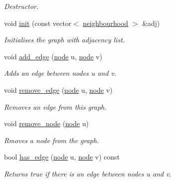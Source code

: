 \begin{DoxyCompactItemize}
\begin{DoxyCompactList}\small\item\em Destructor. \end{DoxyCompactList}\item 
void \hyperlink{classlgraph_1_1utils_1_1udgraph_a1006a1b36bd215c7a059dadce714434d}{init} (const vector$<$ \hyperlink{namespacelgraph_1_1utils_a0f2ef47028a466d26841709e705390ac}{neighbourhood} $>$ \&adj)
\begin{DoxyCompactList}\small\item\em Initialises the graph with adjacency list. \end{DoxyCompactList}\item 
void \hyperlink{classlgraph_1_1utils_1_1udgraph_accf8897335f6cfce5e001c2907462226}{add\-\_\-edge} (\hyperlink{namespacelgraph_1_1utils_a7bd66ede3805ef121bc2835bd48de0cf}{node} u, \hyperlink{namespacelgraph_1_1utils_a7bd66ede3805ef121bc2835bd48de0cf}{node} v)
\begin{DoxyCompactList}\small\item\em Adds an edge between nodes {\itshape u} and {\itshape v}. \end{DoxyCompactList}\item 
void \hyperlink{classlgraph_1_1utils_1_1udgraph_ad414c0739a86b461af2c8160bca07f0b}{remove\-\_\-edge} (\hyperlink{namespacelgraph_1_1utils_a7bd66ede3805ef121bc2835bd48de0cf}{node} u, \hyperlink{namespacelgraph_1_1utils_a7bd66ede3805ef121bc2835bd48de0cf}{node} v)
\begin{DoxyCompactList}\small\item\em Removes an edge from this graph. \end{DoxyCompactList}\item 
void \hyperlink{classlgraph_1_1utils_1_1udgraph_a222b4e52f0615ffc492cdb45d93e45c8}{remove\-\_\-node} (\hyperlink{namespacelgraph_1_1utils_a7bd66ede3805ef121bc2835bd48de0cf}{node} u)
\begin{DoxyCompactList}\small\item\em Rmoves a node from the graph. \end{DoxyCompactList}\item 
bool \hyperlink{classlgraph_1_1utils_1_1udgraph_aebc98d234955028116978eff9c13445b}{has\-\_\-edge} (\hyperlink{namespacelgraph_1_1utils_a7bd66ede3805ef121bc2835bd48de0cf}{node} u, \hyperlink{namespacelgraph_1_1utils_a7bd66ede3805ef121bc2835bd48de0cf}{node} v) const 
\begin{DoxyCompactList}\small\item\em Returns true if there is an edge between nodes {\itshape u} and {\itshape v}. \end{DoxyCompactList}\item 

\end{DoxyCompactItemize}
